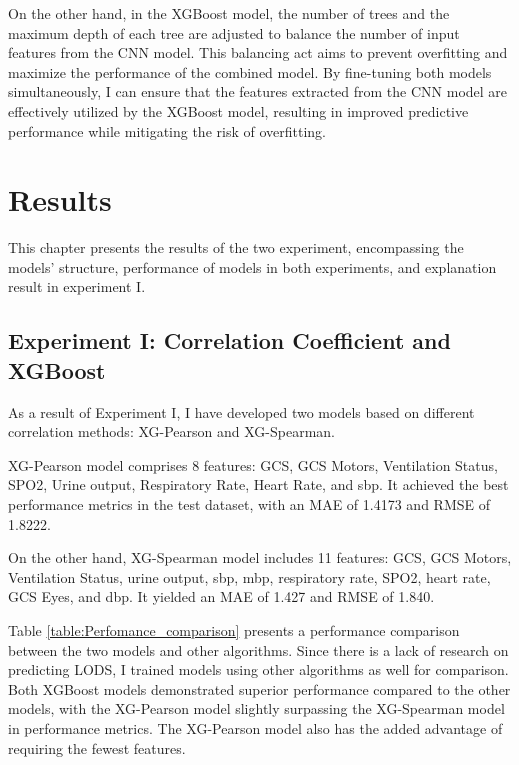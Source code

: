 \documentclass[12pt,a4paper,english
]{tunithesis}
\begin{document}
On the other hand, in the XGBoost model, the number of trees and the maximum depth of each tree are adjusted to balance the number of input features from the CNN model. This balancing act aims to prevent overfitting and maximize the performance of the combined model. By fine-tuning both models simultaneously, I can ensure that the features extracted from the CNN model are effectively utilized by the XGBoost model, resulting in improved predictive performance while mitigating the risk of overfitting.

\chapter{Results}
\label{ch:results}
This chapter presents the results of the two experiment, encompassing the models' structure, performance of models in both experiments, and explanation result in experiment I.

\section{Experiment I: Correlation Coefficient and XGBoost}

As a result of Experiment I, I have developed two models based on different correlation methods: XG-Pearson and XG-Spearman.

XG-Pearson model comprises 8 features: GCS, GCS Motors, Ventilation Status, SPO2, Urine output, Respiratory Rate, Heart Rate, and sbp. It achieved the best performance metrics in the test dataset, with an MAE of 1.4173 and RMSE of 1.8222.

On the other hand, XG-Spearman model includes 11 features: GCS, GCS Motors, Ventilation Status, urine output, sbp, mbp, respiratory rate, SPO2, heart rate, GCS Eyes, and dbp. It yielded an MAE of 1.427 and RMSE of 1.840.

Table \ref{table:Perfomance_comparison} presents a performance comparison between the two models and other algorithms. Since there is a lack of research on predicting LODS, I trained models using other algorithms as well for comparison. Both XGBoost models demonstrated superior performance compared to the other models, with the XG-Pearson model slightly surpassing the XG-Spearman model in performance metrics. The XG-Pearson model also has the added advantage of requiring the fewest features.
\end{document}
